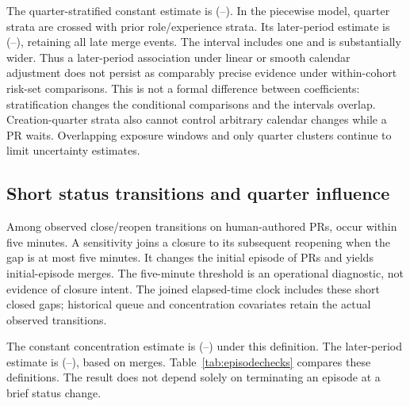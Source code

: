 \documentclass[11pt]{article}
\begin{document}
The quarter-stratified constant estimate is \CalendarQuarterHR{}
(\CalendarQuarterLower{}--\CalendarQuarterUpper{}). In the piecewise model,
quarter strata are crossed with prior role/experience strata. Its later-period
estimate is \CalendarQuarterLateHR{}
(\CalendarQuarterLateLower{}--\CalendarQuarterLateUpper{}), retaining all
\CalendarQuarterLateEvents{} late merge events. The interval includes one
and is substantially wider. Thus a later-period association under linear or
smooth calendar adjustment does not persist as comparably precise evidence
under within-cohort risk-set comparisons. This is not a formal difference
between coefficients: stratification changes the conditional comparisons and
the intervals overlap. Creation-quarter strata also cannot control arbitrary
calendar changes while a PR waits. Overlapping exposure windows and only
\CoxQuarterClusters{} quarter clusters continue to limit uncertainty estimates.

\begin{table}[tb]
\centering\small
\caption{Calendar-control diagnostics, HR per 0.1 merger HHI with 95\% intervals.
Constant models retain role/experience covariates; piecewise models use their
baseline strata, crossed with quarter in the final row. Comparisons change the
conditional estimand and do not identify a causal effect.}
\label{tab:calendar}
\end{table}

\subsection{Short status transitions and quarter influence}
Among \CloseReopenTransitions{} observed close/reopen transitions on
human-authored PRs, \ShortCloseReopenTransitions{} occur within five minutes.
A sensitivity joins a closure to its subsequent reopening when the gap is at
most five minutes. It changes the initial episode of \CoalescedModifiedPRs{}
PRs and yields \CoalescedMergeCount{} initial-episode merges.
The five-minute threshold is an operational diagnostic, not evidence of closure
intent. The joined elapsed-time clock includes these short closed gaps; historical
queue and concentration covariates retain the actual observed transitions.

The constant concentration estimate is \CoalescedConstantHR{}
(\CoalescedConstantLower{}--\CoalescedConstantUpper{}) under this definition.
The later-period estimate is \CoalescedLateHR{}
(\CoalescedLateLower{}--\CoalescedLateUpper{}), based on
\CoalescedLateMerges{} merges. Table~\ref{tab:episodechecks} compares these
definitions. The result does not depend solely on terminating an episode at a
brief status change.
\end{document}
